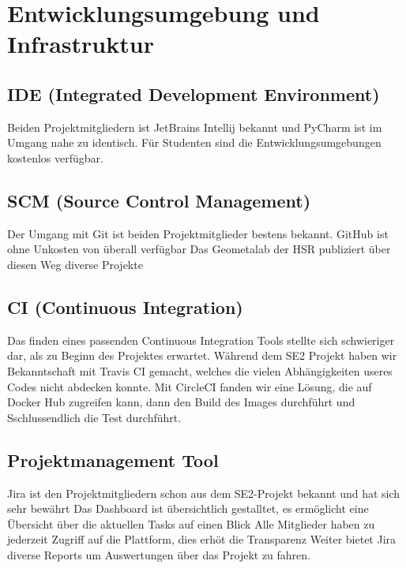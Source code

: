 \section{Entwicklungsumgebung und Infrastruktur}
\subsection{IDE (Integrated Development Environment)}
Beiden Projektmitgliedern ist JetBrains Intellij bekannt und PyCharm ist im Umgang nahe zu identisch.
Für Studenten sind die Entwicklungsumgebungen kostenlos verfügbar.
\subsection{SCM (Source Control Management)}
Der Umgang mit Git ist beiden Projektmitglieder bestens bekannt.
GitHub ist ohne Unkosten von überall verfügbar
Das Geometalab der HSR publiziert über diesen Weg diverse Projekte

\subsection{CI (Continuous Integration)}
Das finden eines passenden Continuous Integration Tools stellte sich schwieriger dar, als zu Beginn des Projektes erwartet. Während dem SE2 Projekt haben wir Bekanntschaft mit Travis CI gemacht, welches die vielen Abhängigkeiten useres Codes nicht abdecken konnte. Mit CircleCI fanden wir eine Lösung, die auf Docker Hub zugreifen kann, dann den Build des Images durchführt und Sschlussendlich die Test durchführt.

\subsection{Projektmanagement Tool}
Jira ist den Projektmitgliedern schon aus dem SE2-Projekt bekannt und hat sich sehr bewährt
Das Dashboard ist übersichtlich gestalltet, es ermöglicht eine Übersicht über die aktuellen Tasks auf einen Blick
Alle Mitglieder haben zu jederzeit Zugriff auf die Plattform, dies erhöt die Transparenz
Weiter bietet Jira diverse Reports um Auswertungen über das Projekt zu fahren.
